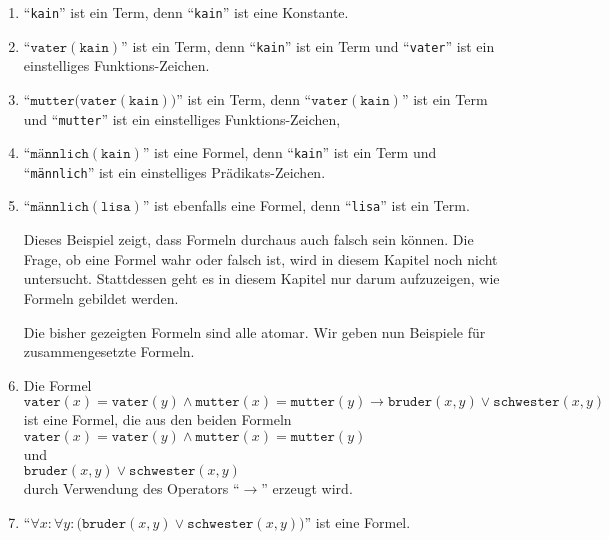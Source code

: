 \begin{enumerate}
\item ``\texttt{kain}'' ist ein Term, denn ``\texttt{kain}'' ist eine Konstante.
\item ``$\mathtt{vater}(\mathtt{kain})$'' ist ein Term, denn ``\texttt{kain}''
      ist ein Term und ``\texttt{vater}'' ist ein einstelliges Funktions-Zeichen.
\item ``$\mathtt{mutter}\bigl(\mathtt{vater}(\mathtt{kain})\bigr)$'' ist ein Term, denn ``$\mathtt{vater}(\mathtt{kain})$'' ist
      ein Term und ``\texttt{mutter}'' ist ein einstelliges Funktions-Zeichen,
\item ``$\texttt{m\"annlich}(\mathtt{kain})$'' ist eine Formel, denn
      ``\texttt{kain}'' ist ein Term und
      ``\texttt{m\"annlich}'' ist ein einstelliges Pr\"adikats-Zeichen.
\item ``$\texttt{m\"annlich}(\mathtt{lisa})$'' ist ebenfalls eine Formel, denn
      ``\texttt{lisa}'' ist ein Term. 

      Dieses Beispiel zeigt, dass Formeln durchaus auch falsch sein k\"onnen.  Die Frage, ob eine
      Formel wahr oder falsch ist, wird in diesem Kapitel noch nicht untersucht.  Stattdessen geht
      es in diesem Kapitel nur darum aufzuzeigen, wie Formeln gebildet werden.

      Die bisher gezeigten Formeln sind alle atomar.  Wir geben nun Beispiele f\"ur zusammengesetzte 
      Formeln.
\item Die Formel
      \\[0.2cm]
      \hspace*{1.3cm}
      $\mathtt{vater}(x) = \mathtt{vater}(y) \wedge \mathtt{mutter}(x) = \mathtt{mutter}(y)
         \rightarrow       \mathtt{bruder}(x,y) \vee \mathtt{schwester}(x,y)$
      \\[0.2cm]
      ist eine Formel, die aus den beiden Formeln \\[0.2cm]
      \hspace*{1.3cm}  $\mathtt{vater}(x) = \mathtt{vater}(y) \wedge \mathtt{mutter}(x) =
      \mathtt{mutter}(y)$ \quad 
      \\[0.0cm]
      und 
      \\[0.0cm]
      \hspace*{1.3cm}  $\mathtt{bruder}(x,y) \vee \mathtt{schwester}(x,y)$ 
      \\[0.2cm]
      durch Verwendung des Operators ``$\rightarrow$'' erzeugt wird.  
\item ``$\forall x\colon \forall y\colon \bigl(\mathtt{bruder}(x,y) \vee \mathtt{schwester}(x,y)\bigr)$''   ist eine Formel.
\end{enumerate}
